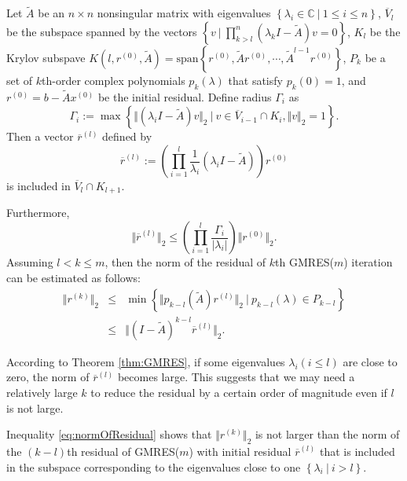 \begin{thm}
  \label{thm:GMRES}
  Let $\tilde{A}$ be an $n\times n$ nonsingular matrix with
  eigenvalues $\left\{\lambda_i\in\mathbb{C}\ |\  1\leq i \leq n\right\}$,
  $\overline{V}_l$ be the subspace spanned by the vectors
  $\left\{ v\ |\ \prod_{k>l}^n(\lambda_kI-\tilde{A})v=0\right\}$,
  $K_l$ be the Krylov subspave
  $K(l,r^{(0)},\tilde{A})=\mbox{span}\left\{ r^{(0)},
    \tilde{A}r^{(0)},\cdots, \tilde{A}^{l-1}r^{(0)}\right\}$, 
  $P_k$ be a set of $k$th-order complex polynomials $p_k(\lambda)$ that
  satisfy $p_k(0)=1$, and $r^{(0)}=b-\tilde{A}x^{(0)}$ be the initial
  residual. Define radius $\Gamma_i$ as
  \begin{equation}
    \label{eq:Radius}
    \Gamma_i := \max\left\{\Vert (\lambda_iI-\tilde{A})v \Vert_2\ |\ 
      v\in\overline{V}_{i-1}\cap K_i, \Vert v \Vert_2=1\right\}.
  \end{equation}
  Then a vector $\overline{r}^{(l)}$ defined by
  \begin{equation}
    \label{eq:rl}
    \overline{r}^{(l)} :=
    \left(\prod\limits_{i=1}^l\frac{1}{\lambda_i}(\lambda_iI-\tilde{A})\right)r^{(0)}
  \end{equation}
  is included in $\overline{V}_l\cap K_{l+1}.$

  Furthermore,
  \begin{equation}
    \label{eq:normOfrRl}
    \Vert \overline{r}^{(l)} \Vert_2 \leq
    \left(\prod\limits_{i=1}^l\frac{\Gamma_i}{|\lambda_i|}\right)
    \Vert r^{(0)}\Vert_2.
  \end{equation}
  Assuming $l<k\leq m$, then the norm of the residual of $k$th
  GMRES($m$) iteration can be estimated as follows:
  \begin{eqnarray}
    \label{eq:normOfResidual}
    \Vert r^{(k)} \Vert_2&\leq& \min\left\{\Vert
    p_{k-l}(\tilde{A})r^{(l)}\Vert_2 \ |\  p_{k-l}(\lambda)\in P_{k-l}\right\}
    \\
    \label{eq:normOfResidual2}
                         &\leq& \Vert (I-\tilde{A})^{k-l}\overline{r}^{(l)} \Vert_2.
  \end{eqnarray}
\end{thm}

According to Theorem \ref{thm:GMRES}, if some eigenvalues
$\lambda_i(i\leq l)$ are close to zero, the norm of
$\overline{r}^{(l)}$ becomes large. This suggests that we may need a
relatively large $k$ to reduce the residual by a certain order of
magnitude even if $l$ is not large.

Inequality \eqref{eq:normOfResidual} shows that $\Vert r^{(k)}
\Vert_2$ is not larger than the norm of the $(k-l)$th residual of
GMRES($m$) with initial residual $\overline{r}^{(l)}$ that is included
in the subspace corresponding to the eigenvalues close to one
$\left\{\lambda_i\ |\ i>l\right\}$.

